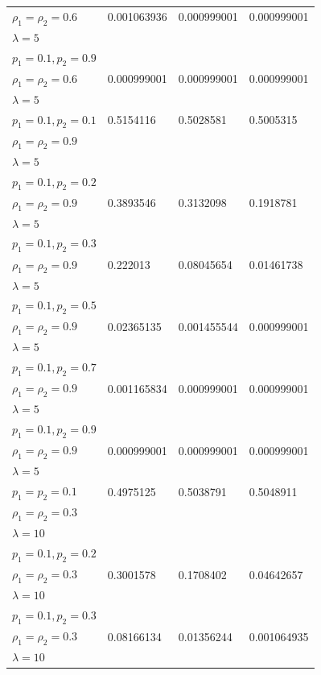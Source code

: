\documentclass[12pt,oneside]{report}
\theoremstyle{definition}
\theoremstyle{mystyle}
\begin{document}
\begin{landscape}
\begin{center}
\begin{longtable}{|l|l|l| l|}
		$ \rho_{1}=\rho_{2}=0.6 $  & 0.001063936 &0.000999001  &0.000999001\\
		$\lambda=5$ &  &  &\\ \hline
		$ p_{1}=0.1,p_{2}=0.9$ &   &  &  \\
		$ \rho_{1}=\rho_{2}=0.6 $  &0.000999001  & 0.000999001 &0.000999001\\
		$\lambda=5$ &  &  &\\ \hline
		$ p_{1}=0.1,p_{2}=0.1$& 0.5154116&0.5028581& 0.5005315\\
		$ \rho_{1}=\rho_{2}=0.9 $ && &\\
		$\lambda=5$&&&\\ \hline
		$ p_{1}=0.1,p_{2}=0.2$&&&\\
		$ \rho_{1}=\rho_{2}=0.9 $ &0.3893546&  0.3132098&0.1918781\\
		$\lambda=5$&&&\\ \hline
		$ p_{1}=0.1,p_{2}=0.3$&&&\\
		$ \rho_{1}=\rho_{2}=0.9 $ & 0.222013&0.08045654& 0.01461738\\
		$\lambda=5$&&&\\ \hline
		$ p_{1}=0.1,p_{2}=0.5$&&&\\
		$ \rho_{1}=\rho_{2}=0.9 $ &  0.02365135&0.001455544& 0.000999001\\
		$\lambda=5$&&&\\ \hline
		$ p_{1}=0.1,p_{2}=0.7$&&&\\
		$ \rho_{1}=\rho_{2}=0.9 $ &0.001165834& 0.000999001&0.000999001\\
		$\lambda=5$&&&\\ \hline
		$ p_{1}=0.1,p_{2}=0.9$&&&\\
		$ \rho_{1}=\rho_{2}=0.9 $ & 0.000999001&0.000999001&0.000999001\\
		$\lambda=5$&&&\\ \hline
		$ p_{1}=p_{2}=0.1 $ &0.4975125  &0.5038791  &0.5048911  \\
		$ \rho_{1}=\rho_{2}=0.3 $ & &  & \\
		$\lambda=10$ &  &  &\\ \hline
		$ p_{1}=0.1,p_{2}=0.2 $  &   &  & \\
		$ \rho_{1}=\rho_{2}=0.3 $  &0.3001578  &0.1708402 & 0.04642657 \\
		$\lambda=10$ &  &  &\\ \hline
		$ p_{1}=0.1,p_{2}=0.3 $ &   &  &  \\
		$ \rho_{1}=\rho_{2}=0.3 $  & 0.08166134 & 0.01356244& 0.001064935\\
		$\lambda=10$ &  & & \\ \hline

\end{longtable}
\end{center}
\end{landscape}
\end{document}
